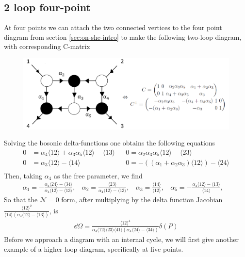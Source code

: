 \documentclass[letter,11pt]{article}
\newcommand{\ab}[1]{\langle #1 \rangle}
\begin{document}
\subsection{2 loop four-point}
At four points we can attach the two connected vertices to the four point diagram from section \ref{sec:on-she-intro} to make the following two-loop diagram, with corresponding C-matrix
\begin{figure}[H]
	\centering
	\includegraphics[width=0.7\linewidth]{two-loop}
	\caption{}
	\label{fig:two-loop}
\end{figure}
\noindent Solving the bosonic delta-functions one obtains the following equations
\begin{equation}
	\begin{aligned}
		0&=\alpha_{4} \langle 1 2 \rangle + \alpha_{3} \alpha_{5} \langle 1 2 \rangle - \langle 1 3 \rangle
		&&0=\alpha_{2} \alpha_{3} \alpha_{5} \langle 1 2 \rangle - \langle 2 3 \rangle
		\\
		0&=\alpha_{3} \langle 1 2 \rangle - \langle 1 4 \rangle
		&&0=-((\alpha_{1} + \alpha_{2} \alpha_{3}) \langle 1 2 \rangle) - \langle 2 4 \rangle
		\\
	\end{aligned}
\end{equation}
Then, taking $\alpha_4$ as the free parameter, we find
\begin{equation}
	\begin{aligned}
		\alpha_1=-\frac{\alpha_4\ab{24}-\ab{34}}{\alpha_4\ab{12}-\ab{13}},~~~~\alpha_2=\frac{\ab{23}}{\alpha_4\ab{12}-\ab{13}},~~~~\alpha_3=\frac{\ab{14}}{\ab{12}},~~~~\alpha_5=-\frac{\alpha_4\ab{12}-\ab{13}}{\ab{14}},~~~~
	\end{aligned}
\end{equation}
So that the $\mathcal{N}=0$ form, after multiplying by the delta function Jacobian $\frac{\ab{12}^2}{\ab{14}\left(\alpha_4\ab{12}-\ab{13}\right)}$, is
\begin{equation}
	\begin{aligned}
	\dd\Omega = \frac{\ab{12}^4}{\alpha_4\ab{12}\ab{23}\ab{41}\left(\alpha_4\ab{24}-\ab{34}\right)}\delta(P)	\end{aligned}
\end{equation}
Before we approach a diagram with an internal cycle, we will first give another example of a higher loop diagram, specifically at five points.
\end{document}
